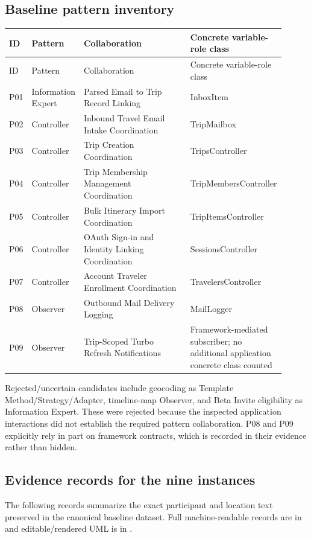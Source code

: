 \documentclass[11pt,a4paper]{article}
\renewcommand{\_}{\textunderscore\allowbreak}
\begin{document}
\subsection{Baseline pattern inventory}
\begin{longtable}{p{0.07\linewidth}p{0.18\linewidth}p{0.44\linewidth}p{0.22\linewidth}}
\toprule ID & Pattern & Collaboration & Concrete variable-role class\\\midrule\endfirsthead
\toprule ID & Pattern & Collaboration & Concrete variable-role class\\\midrule\endhead
P01 & Information Expert & Parsed Email to Trip Record Linking & InboxItem\\
P02 & Controller & Inbound Travel Email Intake Coordination & TripMailbox\\
P03 & Controller & Trip Creation Coordination & TripsController\\
P04 & Controller & Trip Membership Management Coordination & TripMembersController\\
P05 & Controller & Bulk Itinerary Import Coordination & TripItemsController\\
P06 & Controller & OAuth Sign-in and Identity Linking Coordination & SessionsController\\
P07 & Controller & Account Traveler Enrollment Coordination & TravelersController\\
P08 & Observer & Outbound Mail Delivery Logging & MailLogger\\
P09 & Observer & Trip-Scoped Turbo Refresh Notifications & Framework-mediated subscriber; no additional application concrete class counted\\
\bottomrule
\end{longtable}

Rejected/uncertain candidates include geocoding as Template Method/Strategy/Adapter, timeline-map Observer, and Beta Invite eligibility as Information Expert. These were rejected because the inspected application interactions did not establish the required pattern collaboration. P08 and P09 explicitly rely in part on framework contracts, which is recorded in their evidence rather than hidden.

\subsection{Evidence records for the nine instances}
The following records summarize the exact participant and location text preserved in the canonical baseline dataset. Full machine-readable records are in  and editable/rendered UML is in .
\end{document}
